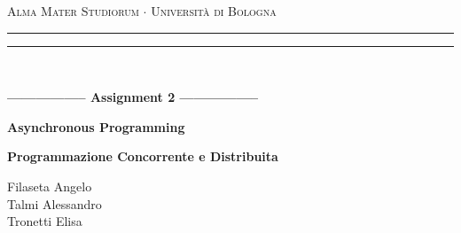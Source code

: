 \begin{titlepage}
	\begin{center}
		{{\Large{\textsc{Alma Mater Studiorum $\cdot$ Università di Bologna}}}}
		\rule[0.1cm]{15.8cm}{0.1mm}
		\rule[0.5cm]{15.8cm}{0.6mm}
		\\
		\vspace{3mm}
	\end{center}
	\vspace{2mm}
	\begin{center}
		{\LARGE{\bf{----------------- Assignment 2 -----------------}}}
		\vspace{5mm} \par \noindent
		{\Huge{\bf{Asynchronous Programming}}}
		\vspace{10mm} \par \noindent
		{\LARGE \textbf{Programmazione Concorrente e Distribuita}}
		\vspace{15mm} \par \noindent
		{\Large Filaseta Angelo\\
			Talmi Alessandro\\
			Tronetti Elisa\\}
	\end{center}
	\hfill
	\vspace{40mm}
\end{titlepage}
